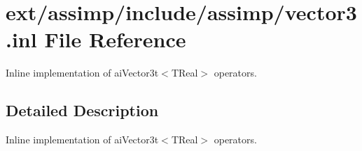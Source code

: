 \hypertarget{vector3_8inl}{\section{ext/assimp/include/assimp/vector3.inl File Reference}
\label{vector3_8inl}
}


Inline implementation of ai\-Vector3t$<$\-T\-Real$>$ operators.  




\subsection{Detailed Description}
Inline implementation of ai\-Vector3t$<$\-T\-Real$>$ operators. 